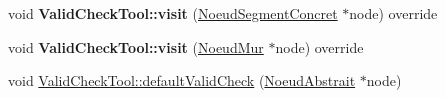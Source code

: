 \begin{DoxyCompactItemize}
\item 
\hypertarget{group__inf2990_ga78a2a77e640811375ddcf280792bc9ce}{void {\bfseries Valid\-Check\-Tool\-::visit} (\hyperlink{class_noeud_segment_concret}{Noeud\-Segment\-Concret} $\ast$node) override}\label{group__inf2990_ga78a2a77e640811375ddcf280792bc9ce}

\item 
\hypertarget{group__inf2990_gad91e261311122bc94172813602534772}{void {\bfseries Valid\-Check\-Tool\-::visit} (\hyperlink{class_noeud_mur}{Noeud\-Mur} $\ast$node) override}\label{group__inf2990_gad91e261311122bc94172813602534772}

\item 
\hypertarget{group__inf2990_ga58a361b0ca91a2b7acb338d39bc0172a}{void \hyperlink{group__inf2990_ga58a361b0ca91a2b7acb338d39bc0172a}{Valid\-Check\-Tool\-::default\-Valid\-Check} (\hyperlink{class_noeud_abstrait}{Noeud\-Abstrait} $\ast$node)}\label{group__inf2990_ga58a361b0ca91a2b7acb338d39bc0172a}


\end{DoxyCompactItemize}
